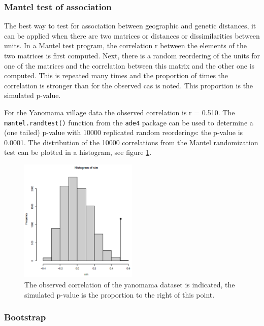 \documentclass{article}
\begin{document}
\subsubsection{Mantel test of association}
The best way to test for association between geographic and genetic distances, it can be applied when there are two matrices or distances or dissimilarities between units. In a Mantel test program, the correlation r between the elements of the two matrices is first computed. Next, there is a random reordering of the units for one of the matrices and the correlation between this matrix and the other one is computed. This is repeated many times and the proportion of times the correlation is stronger than for the observed cas is noted. This proportion is the simulated p-value. \par 
For the Yanomama village data the observed correlation is r = 0.510. The \texttt{mantel.randtest()} function from the \texttt{ade4} package can be used to determine a (one tailed) p-value with 10000 replicated random reorderings: the p-value is 0.0001. The distribution of the 10000 correlations from the Mantel randomization test can be plotted in a histogram, see figure \ref{yanomama}.

\begin{figure}[h]
    \centering
    \label{yanomama}
    \includegraphics[width = 0.5\textwidth]{bayesian/Mantel-corr-hist.png}
    \caption{The observed correlation of the yanomama dataset is indicated, the simulated p-value is the proportion to the right of this point.}
\end{figure}


\subsubsection{Bootstrap}
\end{document}
